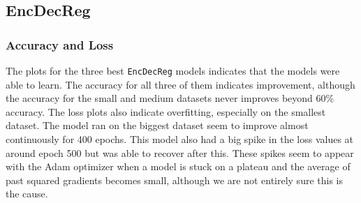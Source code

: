 \subsection{EncDecReg}
\subsubsection{Accuracy and Loss}

The plots for the three best {\tt EncDecReg} models indicates that the models were able to learn. The accuracy for all three of them indicates improvement, although the accuracy for the small and medium datasets never improves beyond 60\% accuracy. The loss plots also indicate overfitting, especially on the smallest dataset. The model ran on the biggest dataset seem to improve almost continuously for 400 epochs. This model also had a big spike in the loss values at around epoch 500 but was able to recover after this. These spikes seem to appear with the Adam optimizer when a model is stuck on a plateau and the average of past squared gradients becomes small, although we are not entirely sure this is the cause.

\newpage
